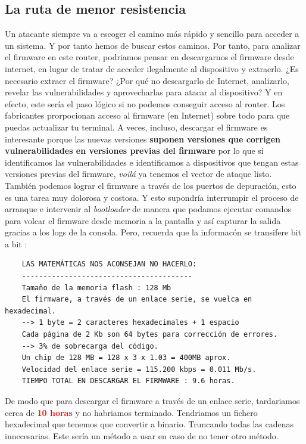 \documentclass[12pt,a4paper, brazil]{article}
\begin{document}
\subsection{La ruta de menor resistencia}
Un atacante siempre va a escoger el camino más rápido y sencillo para acceder a un sistema. Y por tanto hemos de buscar estos caminos. Por tanto, para analizar el firmware en este router, podriamos pensar en descargarnos el firmware desde internet, en lugar de tratar de acceder ilegalmente al dispositivo y extraerlo. ¿Es necesario extraer el firmware? ¿Por qué no descargarlo de Internet, analizarlo, revelar las vulnerabilidades y aprovecharlas para atacar al dispositivo? Y en efecto, este sería el paso lógico si no podemos conseguir acceso al router. Los fabricantes prorpocionan acceso al firmware (en Internet) sobre todo para que puedas actualizar tu terminal. A veces, incluso, descargar el firmware es interesante porque las nuevas versiones \textbf{suponen versiones que corrigen vulnerabilidades en versiones previas del firmware} por lo que si identificamos las vulnerabilidades e identificamos a dispositivos que tengan estas versiones previas del firmware, \emph{voilá} ya tenemos el vector de ataque listo. También podemos lograr el firmware a través de los puertos de depuración, esto es una tarea muy dolorosa y costosa. Y esto supondría interrumpir el proceso de arranque e intervenir al \emph{bootloader} de manera que podamos ejecutar comandos para volcar el firmware desde memoria a la pantalla y así capturar la salida gracias a los logs de la consola. Pero, recuerda que la informacón se transifere bit a bit :

\begin{verbatim}
    LAS MATEMÁTICAS NOS ACONSEJAN NO HACERLO: 
    ----------------------------------------
    Tamaño de la memoria flash : 128 Mb
    El firmware, a través de un enlace serie, se vuelca en hexadecimal.
    --> 1 byte = 2 caracteres hexadecimales + 1 espacio
    Cada página de 2 Kb son 64 bytes para corrección de errores.
    --> 3% de sobrecarga del código.
    Un chip de 128 MB = 128 x 3 x 1.03 = 400MB aprox.
    Velocidad del enlace serie = 115.200 kbps = 0.011 Mb/s.
    TIEMPO TOTAL EN DESCARGAR EL FIRMWARE : 9.6 horas.
\end{verbatim}

De modo que para descargar el firmware a través de un enlace serie, tardariamos cerca de \textbf{\textcolor{red}{10 horas}} y no habriamos terminado. Tendriamos un fichero hexadecimal que tenemos que convertir a binario. Truncando todas las cadenas innecesarias. Este sería un método a usar en caso de no tener otro método. 
\end{document}

